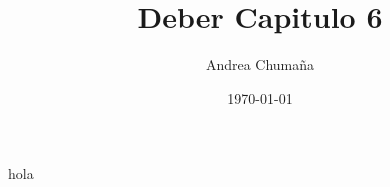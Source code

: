 \documentclass[a4paper, 12pt]{article}
\author{Andrea Chumaña}
\title{Deber Capitulo 6}
\date{\today}
\begin{document}
\maketitle
hola
\cite{*}

\end{document}
